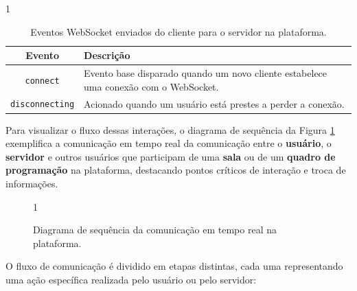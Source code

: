 \begin{table}[H]{1\textwidth}
    \centering
    \caption{Eventos WebSocket enviados do cliente para o servidor na plataforma.}
    \label{tab:websocket-server-control-events}
    \renewcommand{\arraystretch}{1.3} 
    \begin{tabular}{|c|p{10cm}|}
        \hline
        \textbf{Evento} & \textbf{Descrição} \\
        \hline
        \texttt{connect} & Evento base disparado quando um novo cliente estabelece uma conexão com o WebSocket. \\
        \hline
        \texttt{disconnecting} & Acionado quando um usuário está prestes a perder a conexão. \\
        \hline
    \end{tabular}
\end{table}


Para visualizar o fluxo dessas interações, o diagrama de sequência da Figura \ref{fig:websocket-flow} exemplifica a comunicação em tempo real da comunicação entre o \textbf{usuário}, o \textbf{servidor} e outros usuários que participam de uma \textbf{sala} ou de um \textbf{quadro de programação} na plataforma, destacando pontos críticos de interação e troca de informações.

\begin{figure}[H]{1\textwidth}
    \centering
    \caption{Diagrama de sequência da comunicação em tempo real na plataforma.}
    \label{fig:websocket-flow}
\end{figure}

 O fluxo de comunicação é dividido em etapas distintas, cada uma representando uma ação específica realizada pelo usuário ou pelo servidor:

